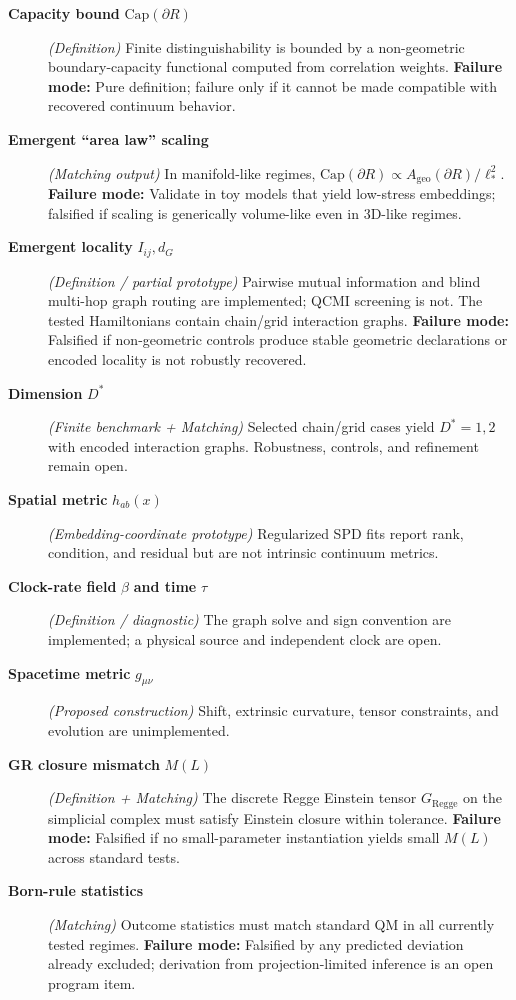 \documentclass[reprint, amsmath, amssymb, aps, prd]{revtex4-2}
\begin{document}
\begin{description}
    \item[\textbf{Capacity bound} $\mathrm{Cap}(\partial R)$] \textit{(Definition)} Finite distinguishability is bounded by a non-geometric boundary-capacity functional computed from correlation weights. \textbf{Failure mode:} Pure definition; failure only if it cannot be made compatible with recovered continuum behavior.
    \item[\textbf{Emergent ``area law'' scaling}] \textit{(Matching output)} In manifold-like regimes, $\mathrm{Cap}(\partial R)\propto A_{\text{geo}}(\partial R)/\ell_*^2$. \textbf{Failure mode:} Validate in toy models that yield low-stress embeddings; falsified if scaling is generically volume-like even in 3D-like regimes.
    \item[\textbf{Emergent locality} $I_{ij}, d_G$] \textit{(Definition / partial prototype)} Pairwise mutual information and blind multi-hop graph routing are implemented; QCMI screening is not. The tested Hamiltonians contain chain/grid interaction graphs. \textbf{Failure mode:} Falsified if non-geometric controls produce stable geometric declarations or encoded locality is not robustly recovered.
    \item[\textbf{Dimension} $D^*$] \textit{(Finite benchmark + Matching)} Selected chain/grid cases yield $D^*=1,2$ with encoded interaction graphs. Robustness, controls, and refinement remain open.
    \item[\textbf{Spatial metric} $h_{ab}(x)$] \textit{(Embedding-coordinate prototype)} Regularized SPD fits report rank, condition, and residual but are not intrinsic continuum metrics.
    \item[\textbf{Clock-rate field} $\beta$ \textbf{and time} $\tau$] \textit{(Definition / diagnostic)} The graph solve and sign convention are implemented; a physical source and independent clock are open.
    \item[\textbf{Spacetime metric} $g_{\mu\nu}$] \textit{(Proposed construction)} Shift, extrinsic curvature, tensor constraints, and evolution are unimplemented.
    \item[\textbf{GR closure mismatch} $M(L)$] \textit{(Definition + Matching)} The discrete Regge Einstein tensor $G_{\text{Regge}}$ on the simplicial complex must satisfy Einstein closure within tolerance. \textbf{Failure mode:} Falsified if no small-parameter instantiation yields small $M(L)$ across standard tests.
    \item[\textbf{Born-rule statistics}] \textit{(Matching)} Outcome statistics must match standard QM in all currently tested regimes. \textbf{Failure mode:} Falsified by any predicted deviation already excluded; derivation from projection-limited inference is an open program item.

\end{description}
\end{document}
